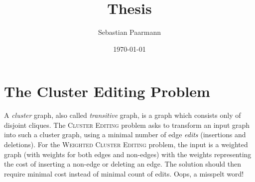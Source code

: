 \documentclass{article}
\title{Thesis}
\author{Sebastian Paarmann}
\date\today
\begin{document}
\maketitle

\tableofcontents

\section{The Cluster Editing Problem}

A \emph{cluster} graph, also called \emph{transitive} graph, is a graph which consists
only of disjoint cliques. The \textsc{Cluster Editing} problem asks to transform an input
graph into such a cluster graph, using a minimal number of edge \emph{edits} (insertions
and deletions). For the \textsc{Weighted Cluster Editing} problem, the input is a weighted
graph (with weights for both edges and non-edges) with the weights representing the cost
of inserting a non-edge or deleting an edge. The solution should then require minimal cost
instead of minimal count of edits. Oops, a misspelt word!
\end{document}
